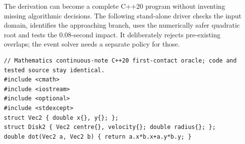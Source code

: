 \hypertarget{02-foundations-ii-ch031-executable-first-contact-quadratic}{}

The derivation can become a complete C++20 program without inventing missing algorithmic decisions. The following stand-alone driver checks the input domain, identifies the approaching branch, uses the numerically safer quadratic root and tests the 0.08-second impact. It deliberately rejects pre-existing overlaps; the event solver needs a separate policy for those.

\begin{verbatim}
// Mathematics continuous-note C++20 first-contact oracle; code and tested source stay identical.
#include <cmath>
#include <iostream>
#include <optional>
#include <stdexcept>
struct Vec2 { double x{}, y{}; };
struct Disk2 { Vec2 centre{}, velocity{}; double radius{}; };
double dot(Vec2 a, Vec2 b) { return a.x*b.x+a.y*b.y; }


\end{verbatim}
